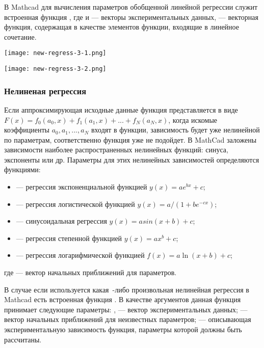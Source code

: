 В Mathcad для вычисления параметров обобщенной линейной регрессии служит встроенная функция , где  и  --- векторы экспериментальных данных,  --- векторная функция, содержащая в качестве элементов функции, входящие в линейное сочетание.


\begin{center}
	\texttt{[image: new-regress-3-1.png]}
\end{center}
\begin{center}
	\texttt{[image: new-regress-3-2.png]}
\end{center}


\subsubsection{Нелиненая регрессия}

Если аппроксимирующая исходные данные функция представляется в виде $F(x) = f_0 (a_0, x) + f_1(a_1,x) +... + f_N(a_N,x)$, когда искомые коэффициенты $a_0, a_1, ..., a_N$ входят в функции, зависимость будет уже нелинейной по параметрам, соответственно функция  уже не подойдет.
В MathCad заложены зависимости наиболее распространенных нелинейных функций: синуса, экспоненты или др. Параметры для этих нелинейных зависимостей определяются функциями: 
\begin{itemize}
	\item {} --- регрессия  экспоненциальной функцией $y(x)=a e^{b x}+c$;
	\item {} --- регрессия логистической функцией $y(x)=a/(1+b e^{-c x})$;
	\item {} --- синусоидальная регрессия $y(x)=a sin(x+b)+c$;
	\item {} --- регрессия степенной функцией $y(x)=a x^b+c$;
	\item {} --- регрессия логарифмической функцией $f(x)=a\ln(x+b)+c$;
\end{itemize}
где  --- вектор начальных приближений для параметров. 

В случае если используется какая~-либо произвольная нелинейная регрессия  в Mathcad есть встроенная функция . В качестве аргументов данная функция принимает следующие параметры: ,  --- вектор экспериментальных данных;  --- вектор начальных приближений для неизвестных параметров;
 --- описывающая экспериментальную зависимость функция, параметры которой должны быть рассчитаны.

